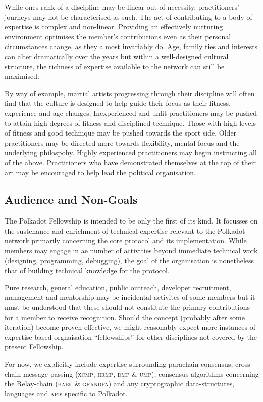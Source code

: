 \documentclass[9pt,oneside]{amsart}
\begin{document}
While ones rank of a discipline may be linear out of necessity, practitioners' journeys may not be  characterised as such. The act of contributing to a body of expertise is complex and non-linear. Providing an effectively nurturing environment optimises the member's contributions even as their personal circumstances change, as they almost invariably do. Age, family ties and interests can alter dramatically over the years but within a well-designed cultural structure, the richness of expertise available to the network can still be maximised.

By way of example, martial artists progressing through their discipline will often find that the culture is designed to help guide their focus as their fitness, experience and age changes. Inexperienced and unfit practitioners may be pushed to attain high degrees of fitness and disciplined technique. Those with high levels of fitness and good technique may be pushed towards the sport side. Older practitioners may be directed more towards flexibility, mental focus and the underlying philospohy. Highly experienced practitioners may begin instructing all of the above. Practitioners who have demonstrated themselves at the top of their art may be encouraged to help lead the political organisation.

\subsection{Audience and Non-Goals}

The Polkadot Fellowship is intended to be only the first of its kind. It focusses on the sustenance and enrichment of technical expertise relevant to the Polkadot network primarily concerning the core protocol and its implementation. While members may engage in ae number of activities beyond immediate technical work (designing, programming, debugging), the goal of the organisation is nonetheless that of building technical knowledge for the protocol.

Pure research, general education, public outreach, developer recruitment, management and mentorship may be incidental activites of some members but it must be understood that these should not constitute the primary contributions for a member to receive recognition. Should the concept (probably after some iteration) become proven effective, we might reasonably expect more instances of expertise-based orgnaisation ``fellowships'' for other disciplines not covered by the present Fellowship.

For now, we explicitly include expertise surrounding parachain consensus, cross-chain message passing (\textsc{xcmp},  \textsc{hrmp}, \textsc{dmp} \& \textsc{ump}), consensus algorithms concerning the Relay-chain (\textsc{babe} \& \textsc{grandpa}) and any cryptographic data-structures, languages and \textsc{api}s specific to Polkadot.
\end{document}
